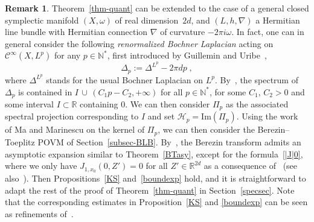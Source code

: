 \documentclass[11pt]{article}
\theoremstyle{definition}
\newtheorem{rema}[theo]{Remark}
\numberwithin{equation}{section}
\numberwithin{figure}{section}
\numberwithin{table}{section}
\newcommand{\R}{{\mathbb{R}}}
\newcommand{\N}{{\mathbb{N}}}
\newcommand{\CC}{\mathcal{C}}
\newcommand{\cH}{{\mathcal{H}}}
\newcommand{\om}{{\omega}}
\newcommand\< {\mathcal{h}}
\renewcommand\> {\mathcal{i}}
\newcommand{\cinf}{\CC^\infty}
\renewcommand{\Im}{\mathrm{Im}}
\begin{document}
\begin{rema}
Theorem~\ref{thm-quant} can be extended to the case of a general closed symplectic manifold $(X,\omega)$ of real dimension~$2d$, and $(L,h,\nabla)$ a Hermitian line bundle with Hermitian connection $\nabla$ of curvature $-2\pi i\om$. In fact, one can in general consider the following
\emph{renormalized Bochner Laplacian} acting on $\cinf(X,L^p)$ for any $p\in\N^*$, first introduced by Guillemin and Uribe~\cite{GU88},
\begin{equation}
\Delta_p:=\Delta^{L^p}-2\pi dp\;,
\end{equation}
where $\Delta^{L^p}$ stands for the usual Bochner Laplacian on $L^p$. By~\cite[Theorem~2.a]{GU88}, the spectrum of $\Delta_p$ is contained in $I\,\cup\,(C_1p-C_2,+\infty)$ for all $p\in\N^*$, for some $C_1,\,C_2>0$ and some interval $I\subset\R$ containing $0$. We can then consider $\Pi_p$ as the associated spectral projection corresponding to $I$ and set $\cH_p=\Im(\Pi_p)$. Using the work~\cite{MM08} of Ma and Marinescu on the kernel of $\Pi_p$, we can then consider the Berezin--Toeplitz POVM of Section~\ref{subsec-BLB}. By~\cite[(2.31),~(3.2)]{LMM16}, the Berezin transform admits an asymptotic expansion similar to Theorem~\ref{BTasy}, except for the formula~\eqref{|J|0}, where we only have $J_{1,x_0}(0,Z')=0$ for all $Z'\in\R^{2d}$ as a consequence of~\cite[Lemma~6.1, Lemma~6.2]{ILMM17} (see also~\cite[(2.32)]{MM08}). Then Propositions~\ref{KS} and~\ref{boundexp} hold, and it is straightforward to adapt the rest of the proof of Theorem~\ref{thm-quant} in Section~\ref{specsec}. Note that the corresponding estimates in Proposition~\ref{KS} and
\ref{boundexp} can be seen as refinements of~\cite{LMM16}.
\end{rema}
\end{document}
